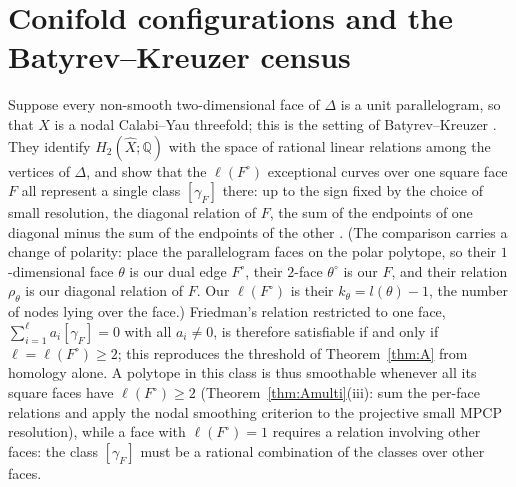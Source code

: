 \documentclass[11pt]{amsart}
\theoremstyle{definition}
\theoremstyle{remark}
\begin{document}
\section{Conifold configurations and the Batyrev--Kreuzer census}
\label{sec:bk}

Suppose every non-smooth two-dimensional face of $\Delta$ is a unit
parallelogram, so that $X$ is a nodal Calabi--Yau threefold; this is the
setting of Batyrev--Kreuzer \cite{BK10}.  They identify
$H_2(\widehat X;\mathbb{Q})$ with the space of rational linear relations
among the vertices of $\Delta$, and show that the $\ell(F^\circ)$
exceptional curves over one square face $F$ all represent a single class
$[\gamma_F]$ there: up to the sign fixed by the choice of small resolution,
the diagonal relation of $F$, the sum of the endpoints of one
diagonal minus the sum of the endpoints of the other \cite{BK10}.
(The comparison carries a change of polarity: \cite{BK10} place the
parallelogram faces on the polar polytope, so their $1$-dimensional face
$\theta$ is our dual edge $F^\circ$, their $2$-face $\theta^\circ$ is our
$F$, and their relation $\rho_\theta$ is our diagonal relation of $F$.
Our $\ell(F^\circ)$ is their $k_\theta = l(\theta) - 1$, the number of
nodes lying over the face.)
Friedman's relation restricted to one face,
$\sum_{i=1}^{\ell} a_i [\gamma_F] = 0$ with all $a_i \neq 0$, is therefore
satisfiable if and only if $\ell = \ell(F^\circ) \ge 2$; this reproduces
the threshold of Theorem~\ref{thm:A} from homology alone.  A polytope in
this class is thus smoothable whenever all its square faces have
$\ell(F^\circ) \ge 2$ (Theorem~\ref{thm:Amulti}(iii): sum the per-face
relations and apply the nodal smoothing criterion to the projective
small MPCP resolution),
while a face with $\ell(F^\circ) = 1$ requires a relation involving
other faces: the class $[\gamma_F]$ must be a rational combination of the classes over
other faces.
\end{document}
